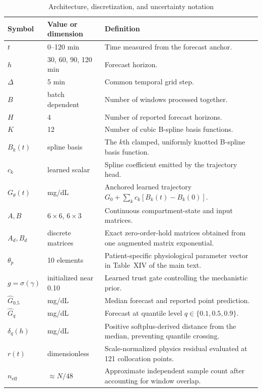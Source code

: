 \documentclass[10pt]{article}
\begin{document}
\begin{table}[h!]
\centering
\caption{Architecture, discretization, and uncertainty notation}
\label{tab:arch}
\footnotesize
\begin{tabular}{lll}
\toprule
Symbol & Value or dimension & Definition \\
\midrule
$t$ & 0--120 min & Time measured from the forecast anchor. \\
$h$ & 30, 60, 90, 120 min & Forecast horizon. \\
$\Delta$ & 5 min & Common temporal grid step. \\
$B$ & batch dependent & Number of windows processed together. \\
$H$ & 4 & Number of reported forecast horizons. \\
$K$ & 12 & Number of cubic B-spline basis functions. \\
$B_k(t)$ & spline basis & The $k$th clamped, uniformly knotted B-spline basis function. \\
$c_k$ & learned scalar & Spline coefficient emitted by the trajectory head. \\
$G_\theta(t)$ & mg/dL & Anchored learned trajectory $G_0 + \sum_k c_k[B_k(t) - B_k(0)]$. \\
$A, B$ & $6\times6$, $6\times3$ & Continuous compartment-state and input matrices. \\
$A_d, B_d$ & discrete matrices & Exact zero-order-hold matrices obtained from one augmented matrix exponential. \\
$\theta_p$ & 10 elements & Patient-specific physiological parameter vector in Table~XIV of the main text. \\
$g = \sigma(\gamma)$ & initialized near 0.10 & Learned trust gate controlling the mechanistic prior. \\
$\hat{G}_{0.5}$ & mg/dL & Median forecast and reported point prediction. \\
$\hat{G}_q$ & mg/dL & Forecast at quantile level $q \in \{0.1, 0.5, 0.9\}$. \\
$\delta_q(h)$ & mg/dL & Positive softplus-derived distance from the median, preventing quantile crossing. \\
$r(t)$ & dimensionless & Scale-normalized physics residual evaluated at 121 collocation points. \\
$n_{\text{eff}}$ & $\approx N/48$ & Approximate independent sample count after accounting for window overlap. \\
\bottomrule
\end{tabular}
\end{table}
\end{document}
